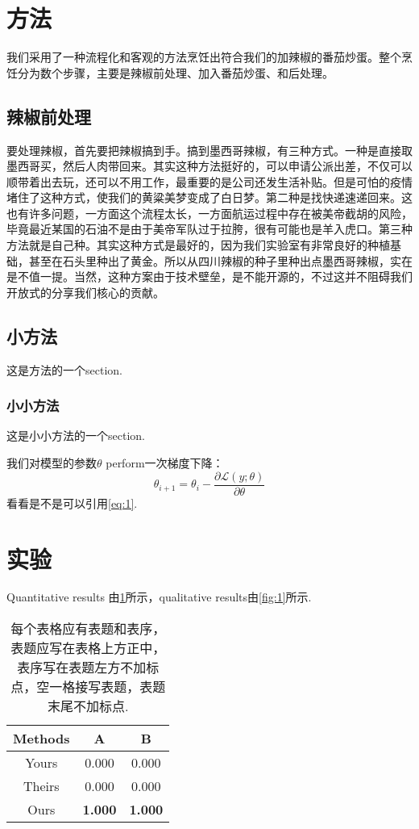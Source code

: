 \clearpage
\section{方法}
我们采用了一种流程化和客观的方法烹饪出符合我们的加辣椒的番茄炒蛋。整个烹饪分为数个步骤，主要是辣椒前处理、加入番茄炒蛋、和后处理。

\subsection{辣椒前处理}
要处理辣椒，首先要把辣椒搞到手。搞到墨西哥辣椒，有三种方式。一种是直接取墨西哥买，然后人肉带回来。其实这种方法挺好的，可以申请公派出差，不仅可以顺带着出去玩，还可以不用工作，最重要的是公司还发生活补贴。但是可怕的疫情堵住了这种方式，使我们的黄粱美梦变成了白日梦。第二种是找快递速递回来。这也有许多问题，一方面这个流程太长，一方面航运过程中存在被美帝截胡的风险，毕竟最近某国的石油不是由于美帝军队过于拉胯，很有可能也是羊入虎口。第三种方法就是自己种。其实这种方式是最好的，因为我们实验室有非常良好的种植基础，甚至在石头里种出了黄金。所以从四川辣椒的种子里种出点墨西哥辣椒，实在是不值一提。当然，这种方案由于技术壁垒，是不能开源的，不过这并不阻碍我们开放式的分享我们核心的贡献。

\subsection{小方法}
这是方法的一个section.
\subsubsection{小小方法}
这是小小方法的一个section.

我们对模型的参数$\theta$ perform一次梯度下降：
\begin{equation}
\label{eq:1}
    \theta_{i+1}=\theta_{i}-\frac{\partial \mathcal{L}(y;\theta)}{\partial \theta}
\end{equation}
看看是不是可以引用\cref{eq:1}.


\clearpage
\section{实验}
Quantitative results 由\cref{tab:1}所示，qualitative results由\cref{fig:1}所示.


\begin{table}[ht]
    \centering
    \caption{每个表格应有表题和表序，表题应写在表格上方正中，表序写在表题左方不加标点，空一格接写表题，表题末尾不加标点.}
    \label{tab:1}
    \begin{tabular}{ccc}
    \toprule
    \textbf{Methods} & \textbf{A} & \textbf{B} \\
    \midrule
    Yours & 0.000 & 0.000 \\
    Theirs & 0.000 & 0.000 \\
    Ours & \textbf{1.000} & \textbf{1.000} \\ 
    \bottomrule
    \end{tabular}
\end{table}

